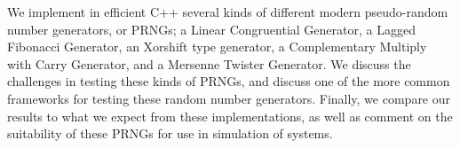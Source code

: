 We implement in efficient C++ several kinds of different modern pseudo-random number generators, or PRNGs; a Linear Congruential Generator, a Lagged Fibonacci Generator, an Xorshift type generator, a Complementary Multiply with Carry Generator, and a Mersenne Twister Generator. We discuss the challenges in testing these kinds of PRNGs, and discuss one of the more common frameworks for testing these random number generators. Finally, we compare our results to what we expect from these implementations, as well as comment on the suitability of these PRNGs for use in simulation of systems.
